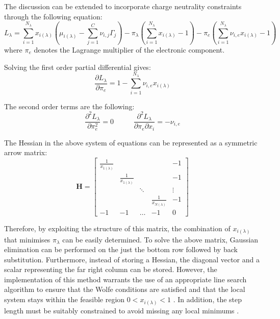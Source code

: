 	 The discussion can be extended to incorporate charge neutrality constraints through the following equation:
	 \begin{equation}
		L_\lambda = \sum_{i=1}^{N_\lambda} x_{i(\lambda)}\left( \mu_{i(\lambda)} - \sum_{j=1}^{C} \nu_{i,j}\Gamma_j \right) - \pi_{\lambda}\left( \sum_{i=1}^{N_\lambda} x_{i(\lambda)} -  1 \right) - \pi_e \left( \sum_{i=1}^{N_\lambda} \nu_{i,e} x_{i(\lambda)} -  1\right)
	\end{equation}
	where $\pi_e$ denotes the Lagrange multiplier of the electronic component.

	Solving the first order partial differential gives:
	\begin{equation}
	\frac{\partial L_\lambda}{\partial \pi_e} = 1 - \sum_{i=1}^{N_\lambda} \nu_{i,e} x_{i(\lambda)}
	\end{equation}

	The second order terms are the following:
	\begin{equation}
	\frac{\partial^2 L_\lambda}{\partial \pi_e^2} = 0 \mspace{50mu} \frac{\partial^2 L_\lambda}{\partial \pi_e \partial x_i} = -\nu_{i,e}
	\end{equation}


	 The Hessian in the above system of equations can be represented as a symmetric arrow matrix:
	 \begin{equation}\label{eq:BB_mat}
        		\mathbf{H} =
        		\begin{bmatrix}
            		\frac{1}{x_{1(\lambda)}} & {} & {} & {} & -1 \\
		 	{} & \frac{1}{x_{1(\lambda)}} & {} & {} & -1 \\
			{} & {} & {\ddots} & {} & \vdots \\
			{} & {} & {} & \frac{1}{x_{N(\lambda)}} & -1 \\
			{-1} & {-1} & {\dots} & {-1} & 0
        		\end{bmatrix}
   	\end{equation}

	Therefore, by exploiting the structure of this matrix, the combination of ${x_{i(\lambda)}}$ that minimises ${\pi_{\lambda}}$ can be easily determined. To solve the above matrix, Gaussian elimination can be performed on the just the bottom row followed by back substitution. Furthermore, instead of storing a Hessian, the diagonal vector and a scalar representing the far right column can be stored. However, the implementation of this method warrants the use of an appropriate line search algorithm to ensure that the Wolfe conditions are satisfied and that the local system stays within the feasible region $0 < x_{i(\lambda)}<1$ . In addition, the step length must be suitably constrained to avoid missing any local minimums \cite{Piro16}.

